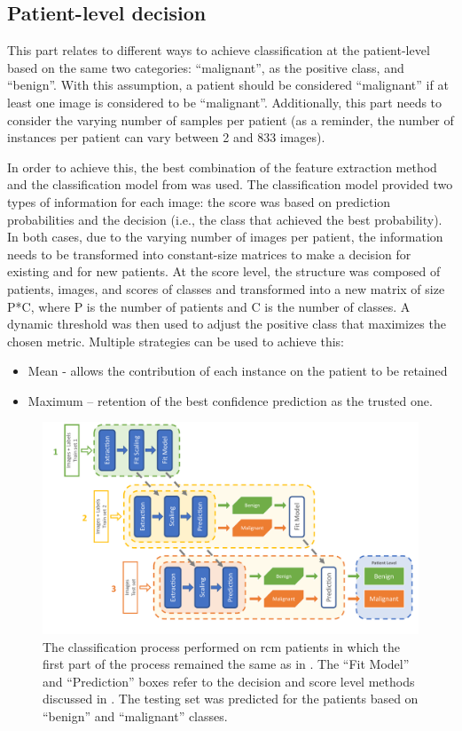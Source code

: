 \documentclass[journal,article,accept,moreauthors,pdftex, applsci]{Definitions/mdpi}
\begin{document}
\subsection{Patient-level decision}
\label{sec:patient_decision}
This part relates to different ways to achieve classification at the patient-level based on the same two categories: “malignant”, as the positive class, and “benign”. With this assumption, a patient should be considered “malignant” if at least one image is considered to be “malignant”. Additionally, this part needs to consider the varying number of samples per patient (as a reminder, the number of instances per patient can vary between 2 and 833 images).\par
In order to achieve this, the best combination of the feature extraction method and the classification model from  was used. The classification model provided two types of information for each image: the score was based on prediction probabilities and the decision (i.e., the class that achieved the best probability). In both cases, due to the varying number of images per patient, the information needs to be transformed into constant-size matrices to make a decision for existing and for new patients. At the score level, the structure was composed of patients, images, and scores of classes and transformed into a new matrix of size P*C, where P is the number of patients and C is the number of classes. A dynamic threshold was then used to adjust the positive class that maximizes the chosen metric. Multiple strategies can be used to achieve this:
\begin{itemize}
\item Mean - allows the contribution of each instance on the patient to be retained
\item Maximum – retention of the best confidence prediction as the trusted one.
\end{itemize}
\begin{figure}[H]
    \begin{center}
        \includegraphics[width=0.8\linewidth]{Figures/Process_Decision.pdf}
        \caption{The classification process performed on \ac{rcm} patients in which the first part of the process remained the same as in . The “Fit Model” and “Prediction” boxes refer to the decision and score level methods discussed in . The testing set was predicted for the patients based on “benign” and “malignant” classes.}
        \label{fig:decision_process}
    \end{center} 
\end{figure}\par
\end{document}

